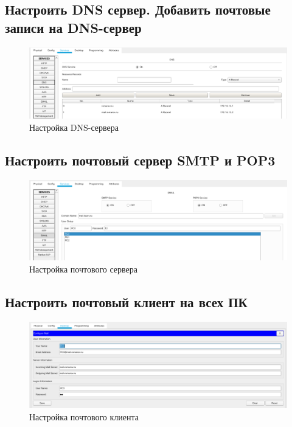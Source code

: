 \documentclass[12pt]{report}
\begin{document}
\subsection*{Настроить DNS сервер. Добавить почтовые записи на DNS-сервер}

\begin{figure}[H]
	\begin{center}
		\includegraphics[scale=0.4]{img/10.png}
	\end{center}
	\caption{Настройка DNS-сервера}
	\label{fig:10}
\end{figure}

\subsection*{Настроить почтовый сервер SMTP и POP3}

\begin{figure}[H]
	\begin{center}
		\includegraphics[scale=0.4]{img/11.png}
	\end{center}
	\caption{Настройка почтового сервера}
	\label{fig:11}
\end{figure}

\subsection*{Настроить почтовый клиент на всех ПК}

\begin{figure}[H]
	\begin{center}
		\includegraphics[scale=0.4]{img/12.png}
	\end{center}
	\caption{Настройка почтового клиента}
	\label{fig:12}
\end{figure}
\end{document}
